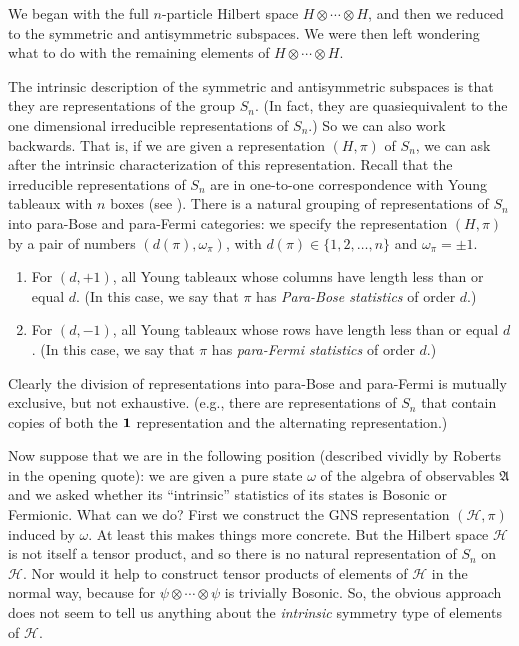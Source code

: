 \documentclass[11pt]{article}
\theoremstyle{definition}
\theoremstyle{definition}
\theoremstyle{remark}
\def\2#1{{\mathcal #1}}
\def\1#1{{\bf #1}}
\def\al#1{{\mathfrak #1}}
\def\om{\omega} \def\Om{\Omega} \def\dd{\partial} \def\D{\Delta}
\begin{document}
We began with the full $n$-particle Hilbert space $H\otimes \cdots
\otimes H$, and then we reduced to the symmetric and antisymmetric
subspaces.  We were then left wondering what to do with the remaining
elements of $H\otimes \cdots \otimes H$.  

The intrinsic description of the symmetric and antisymmetric subspaces
is that they are representations of the group $S_n$.  (In fact, they
are quasiequivalent to the one dimensional irreducible representations
of $S_n$.)  So we can also work backwards.  That is, if we are given a
representation $(H,\pi )$ of $S_n$, we can ask after the intrinsic
characterization of this representation.  Recall that the irreducible
representations of $S_n$ are in one-to-one correspondence with Young
tableaux with $n$ boxes (see \cite{simon}).  There is a natural
grouping of representations of $S_n$ into para-Bose and para-Fermi
categories: we specify the representation $(H,\pi )$ by a pair of
numbers $(d(\pi ),\om _\pi )$, with $d(\pi )\in \{ 1,2,\dots ,n\}$ and
$\om _\pi =\pm 1$.
\begin{enumerate}
\item For $(d,+1)$, all Young tableaux whose columns have length less
  than or equal $d$. (In this case, we say that $\pi$ has
  \emph{Para-Bose statistics} of order $d$.)
\item For $(d,-1)$, all Young tableaux whose rows have length less
  than or equal $d$.  (In this case, we say that $\pi$ has
  \emph{para-Fermi statistics} of order $d$.)
\end{enumerate}
Clearly the division of representations into para-Bose and para-Fermi
is mutually exclusive, but not exhaustive.  (e.g., there are
representations of $S_n$ that contain copies of both the $\11$
representation and the alternating representation.)

Now suppose that we are in the following position
(described vividly by Roberts in the opening quote): we
are given a pure state $\om$ of the algebra of
observables $\al A$ and we asked whether its
``intrinsic'' statistics of its states is Bosonic or
Fermionic.  What can we do?  First we construct the GNS
representation $(\2H ,\pi )$ induced by $\om$.  At
least this makes things more concrete.  But the Hilbert
space $\2H$ is not itself a tensor product, and so
there is no natural representation of $S_n$ on $\2H$.
Nor would it help to construct tensor products of
elements of $\2H$ in the normal way, because for $\psi
\otimes \cdots \otimes \psi$ is trivially Bosonic.  So,
the obvious approach does not seem to tell us anything
about the \emph{intrinsic} symmetry type of elements of
$\2H$.
\end{document}
